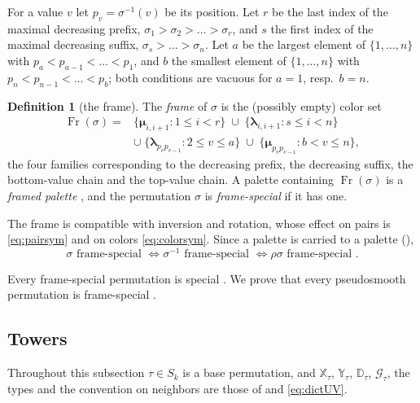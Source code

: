 \documentclass[12pt]{article}
\def\xspace{ }%
\theoremstyle{definition}
\newtheorem{definition}[definition]{Definition}
\newcommand{\psm}{pseudosmooth\xspace}
\newcommand{\spc}{special\xspace}
\newcommand{\pal}{palette\xspace}      %
\newcommand{\fpal}{framed \pal}        %
\newcommand{\XX}{\mathbb{X}}  %
\newcommand{\YY}{\mathbb{Y}}  %
\newcommand{\DD}{\mathbb{D}}  %
\newcommand{\wo}{w_0}                 %
\newcommand{\rc}{\rho}                %
\newcommand{\Gc}{\mathcal{G}}          %
\newcommand{\Fr}{\operatorname{Fr}}    %
\newcommand{\blam}{\boldsymbol{\lambda}}   %
\newcommand{\bmu}{\boldsymbol{\mu}}        %
\begin{document}
For a value $v$ let $p_v = \sigma^{-1}(v)$ be its position. Let $r$ be
the last index of the maximal decreasing prefix, $\sigma_1 > \sigma_2 >
\dots > \sigma_r$, and $s$ the first index of the maximal decreasing
suffix, $\sigma_s > \dots > \sigma_n$. Let $a$ be the largest element
of $\{1,\dots,n\}$ with $p_a < p_{a-1} < \dots < p_1$, and $b$ the
smallest element of $\{1,\dots,n\}$ with $p_n < p_{n-1} < \dots <
p_b$; both conditions are vacuous for $a = 1$, resp.\ $b = n$.

\begin{definition}[the frame]\label{def:frame}
The \emph{frame} of $\sigma$ is the (possibly empty) color set
\begin{equation}\label{eq:frame}
\begin{aligned}
   \Fr(\sigma) = {}& \{\bmu_{i,i+1} : 1 \le i < r\}
   \;\cup\; \{\blam_{i,i+1} : s \le i < n\}\\
   &\cup\; \{\blam_{p_vp_{v-1}} : 2 \le v \le a\}
   \;\cup\; \{\bmu_{p_vp_{v-1}} : b < v \le n\} ,
\end{aligned}
\end{equation}
the four families corresponding to the decreasing prefix, the decreasing
suffix, the bottom-value chain and the top-value chain. A \pal containing
$\Fr(\sigma)$ is a \emph{\fpal}, and the permutation $\sigma$ is
\emph{frame-\spc} if it has one.
\end{definition}


The frame is compatible with inversion and rotation, whose effect on pairs
is \eqref{eq:pairsym} and on colors \eqref{eq:colorsym}.
Since a \pal is carried to a \pal (),
\begin{equation}\label{eq:framesym}
   \sigma \text{ frame-\spc} \iff \sigma^{-1} \text{ frame-\spc}
   \iff \rc\sigma \text{ frame-\spc} .
\end{equation}

Every frame-\spc permutation is \spc. We prove that every \psm permutation is frame-\spc.


\subsection{Towers}\label{ssec:towers}

Throughout this subsection $\tau \in S_k$ is a base permutation, and
$\XX_\tau$, $\YY_\tau$, $\DD_\tau$, $\Gc_\tau$, the types and the
convention on neighbors are those of  and \eqref{eq:dictUV}.
\end{document}
